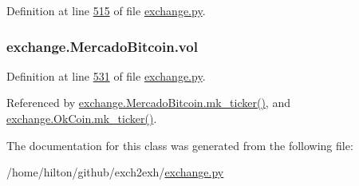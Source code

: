 Definition at line \hyperlink{exchange_8py_source_l00515}{515} of file \hyperlink{exchange_8py_source}{exchange.\+py}.

\subsubsection[{\texorpdfstring{vol}{vol}}]{\setlength{\rightskip}{0pt plus 5cm}exchange.\+Mercado\+Bitcoin.\+vol}\hypertarget{classexchange_1_1_mercado_bitcoin_a1c163489086ba85b960db821117cd433}{}\label{classexchange_1_1_mercado_bitcoin_a1c163489086ba85b960db821117cd433}


Definition at line \hyperlink{exchange_8py_source_l00531}{531} of file \hyperlink{exchange_8py_source}{exchange.\+py}.



Referenced by \hyperlink{exchange_8py_source_l00549}{exchange.\+Mercado\+Bitcoin.\+mk\+\_\+ticker()}, and \hyperlink{exchange_8py_source_l00614}{exchange.\+Ok\+Coin.\+mk\+\_\+ticker()}.



The documentation for this class was generated from the following file\+:\begin{DoxyCompactItemize}
\item 
/home/hilton/github/exch2exh/\hyperlink{exchange_8py}{exchange.\+py}\end{DoxyCompactItemize}

